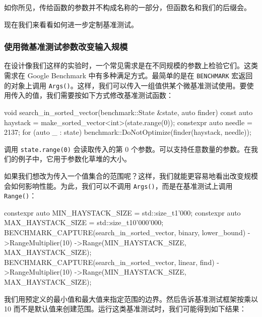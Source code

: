 \label{idx:1169}
如你所见，传给函数的参数并不构成名称的一部分，但函数名和我们的后缀会。

现在我们来看看如何进一步定制基准测试。

\subsubsection{使用微基准测试参数改变输入规模}

\label{idx:1170}
在设计像我们这样的实验时，一个常见需求是在不同规模的参数上检验它们。这类需求在 Google Benchmark 中有多种满足方式。最简单的是在 \texttt{BENCHMARK} 宏返回的对象上调用 \texttt{Args()}。这样，我们可以传入一组值供某个微基准测试使用。要使用传入的值，我们需要按如下方式修改基准测试函数：

\begin{codebox}[cpp]
void search_in_sorted_vector(benchmark::State &state, auto finder) {
  const auto haystack = make_sorted_vector<int>(state.range(0));
  constexpr auto needle = 2137;
  for (auto _ : state) {
    benchmark::DoNotOptimize(finder(haystack, needle));
  }
}
\end{codebox}

调用 \texttt{state.\allowbreak{}range(\allowbreak{}0)\allowbreak{}} 会读取传入的第 0 个参数。可以支持任意数量的参数。在我们的例子中，它用于参数化草堆的大小。

\label{idx:1171}
如果我们想改为传入一个值集合的范围呢？这样，我们就能更容易地看出改变规模会如何影响性能。为此，我们可以不调用 \texttt{Args()}，而是在基准测试上调用 \texttt{Range()}：

\begin{codebox}[cpp]
constexpr auto MIN_HAYSTACK_SIZE = std::size_t{1'000};
constexpr auto MAX_HAYSTACK_SIZE = std::size_t{10'000'000};
BENCHMARK_CAPTURE(search_in_sorted_vector, binary, lower_bound)
    ->RangeMultiplier(10)
    ->Range(MIN_HAYSTACK_SIZE, MAX_HAYSTACK_SIZE);
BENCHMARK_CAPTURE(search_in_sorted_vector, linear, find)
    ->RangeMultiplier(10)
    ->Range(MIN_HAYSTACK_SIZE, MAX_HAYSTACK_SIZE);
\end{codebox}

我们用预定义的最小值和最大值来指定范围的边界。然后告诉基准测试框架按乘以 10 而不是默认值来创建范围。运行这类基准测试时，我们可能得到如下结果：

